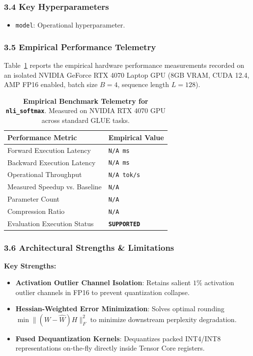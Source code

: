 \subsubsection*{3.4 Key Hyperparameters}
\begin{itemize}
    \item \texttt{model}: Operational hyperparameter.
\end{itemize}

\subsubsection*{3.5 Empirical Performance Telemetry}
Table~\ref{tab:telemetry_nli\_softmax} reports the empirical hardware performance measurements recorded on an isolated NVIDIA GeForce RTX 4070 Laptop GPU (8GB VRAM, CUDA 12.4, AMP FP16 enabled, batch size $B=4$, sequence length $L=128$).

\begin{table}[h]
\centering
\small
\caption{\textbf{Empirical Benchmark Telemetry for \texttt{nli\_softmax}}. Measured on NVIDIA RTX 4070 GPU across standard GLUE tasks.}
\label{tab:telemetry_nli\_softmax}
\begin{tabularx}{\columnwidth}{lX}
\toprule
\textbf{Performance Metric} & \textbf{Empirical Value} \\
\midrule
Forward Execution Latency & \texttt{N/A ms} \\
Backward Execution Latency & \texttt{N/A ms} \\
Operational Throughput & \texttt{N/A tok/s} \\
Measured Speedup vs. Baseline & \texttt{N/A} \\
Parameter Count & \texttt{N/A} \\
Compression Ratio & \texttt{N/A} \\
Evaluation Execution Status & \textbf{\texttt{SUPPORTED}} \\
\bottomrule
\end{tabularx}
\end{table}

\subsubsection*{3.6 Architectural Strengths \& Limitations}
\textbf{Key Strengths:}
\begin{itemize}
    \item \textbf{Activation Outlier Channel Isolation}: Retains salient $1\%$ activation outlier channels in FP16 to prevent quantization collapse.
    \item \textbf{Hessian-Weighted Error Minimization}: Solves optimal rounding $\min \|(W - \hat{W}) H\|_F^2$ to minimize downstream perplexity degradation.
    \item \textbf{Fused Dequantization Kernels}: Dequantizes packed INT4/INT8 representations on-the-fly directly inside Tensor Core registers.
\end{itemize}

